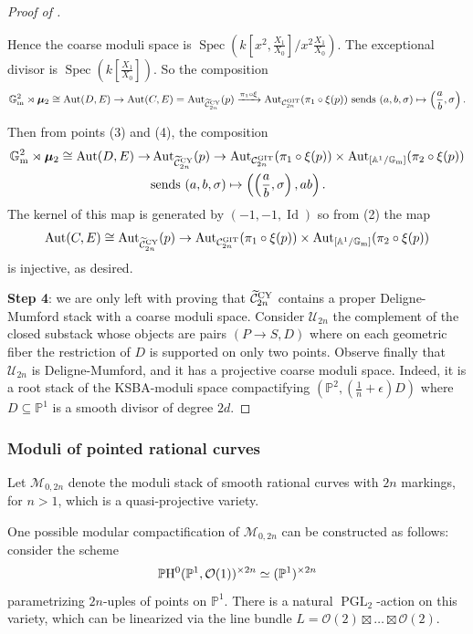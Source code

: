 \documentclass{amsart}
\newcommand{\bA}{\mathbb{A}}
\newcommand{\bG}{\mathbb{G}}
\newcommand{\bP}{\mathbb{P}}
\newcommand{\cC}{\mathcal{C}}
\newcommand{\cO}{\mathcal{O}}
\newcommand{\cU}{\mathcal{U}}
\newcommand{\spec}{\operatorname{Spec}}
\newcommand{\Gm}{\bG_{{\rm m}}}
\newcommand{\Aut}{\operatorname{Aut}}
\newcommand{\PGL}{\operatorname{PGL}}
\newcommand{\Id}{\operatorname{Id}}
\newcommand{\bmu}{\bm{\mu}}
\newcommand{\Mcal}{\mathcal{M}}
\newcommand{\Ctilde}{\widetilde{\mathcal{C}}}
\newcommand{\git}{{\rm GIT}}
\newcommand{\CY}{{\rm CY}}
\theoremstyle{definition}
\theoremstyle{definition}
\begin{document}
{\begin{proof}[Proof of ]
\begin{enumerate}
Hence the coarse moduli space is $\spec(k[x^2,\frac{X_1}{X_0}]/x^2\frac{X_1}{X_0})$. The exceptional divisor is $\spec(k[\frac{X_1}{X_0}])$. So the composition \[\Gm^2\rtimes \bmu_2\cong \Aut(D,E)\to \Aut(C,E)=\Aut_{\widetilde{\cC}^{\CY}_{2n}}(p)\xrightarrow{\pi_1\circ \xi} \Aut_{\cC^{\git}_{2n}}(\pi_1\circ \xi(p))\text{ sends }(a,b,\sigma)\mapsto \left(\frac{a}{b},\sigma\right).\]
    \end{enumerate}
Then from points (3) and (4), the composition
\begin{align*}
\Gm^2\rtimes \bmu_2\cong \Aut(D,E)\to &\Aut_{\widetilde{\cC}^{\CY}_{2n}}(p)\to \Aut_{\cC^{\git}_{2n}}(\pi_1\circ\xi(p))\times \Aut_{[\bA^1/\Gm]}(\pi_2\circ\xi(p))\\&\text{sends } (a,b,\sigma)\mapsto \left(\left(\frac{a}{b},\sigma\right),ab\right).
\end{align*}
The kernel of this map is generated by $(-1,-1,\Id)$ so from (2) the map 
\[\Aut(C,E)\cong \Aut_{\widetilde{\cC}^{\CY}_{2n}}(p)\to \Aut_{\cC^{\git}_{2n}}(\pi_1\circ\xi(p))\times \Aut_{[\bA^1/\Gm]}(\pi_2\circ\xi(p))\]
is injective, as desired.  

    \noindent
    \textbf{Step 4}: we are only left with proving that $\Ctilde_{2n}^{\CY}$ contains a proper Deligne-Mumford stack with a coarse moduli space. Consider $\cU_{2n}$ the complement of the closed substack whose objects are pairs $(P\to S, D)$ where on each geometric fiber the restriction of $D$ is supported on only two points.
    Observe finally that $\cU_{2n}$ is Deligne-Mumford, and it has a projective coarse moduli space. Indeed, it is a root stack of the KSBA-moduli space compactifying $(\bP^2,(\frac{1}{n}+\epsilon )D)$  where $D\subseteq \bP^1$ is a smooth divisor of degree $2d$.
\end{proof}

\subsubsection{Moduli of pointed rational curves}\label{subsubsection_ordered_pts}
Let $\Mcal_{0,2n}$ denote the moduli stack of smooth rational curves with $2n$ markings, for $n>1$, which is a quasi-projective variety.

One possible modular compactification of $\Mcal_{0,2n}$ can be constructed as follows: consider the scheme \[\bP {\rm H}^0(\bP^1,\cO(1))^{\times 2n} \simeq (\bP^1)^{\times 2n}\]parametrizing $2n$-uples of points on $\bP^1$. There is a natural $\PGL_2$-action on this variety, which can be linearized via the line bundle $L=\cO(2)\boxtimes\ldots\boxtimes\cO(2)$. 

}
\end{document}
